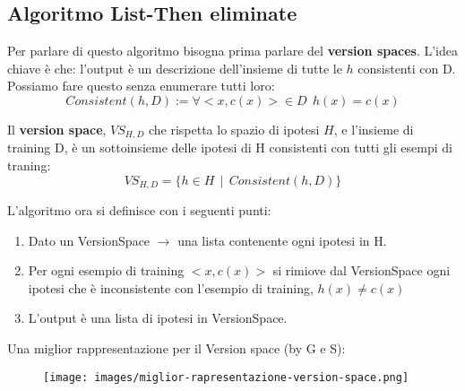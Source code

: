 \subsection{Algoritmo List-Then eliminate}
Per parlare di questo algoritmo bisogna prima parlare del \textbf{version spaces}. L'idea chiave è che: l'output
è un descrizione dell'insieme di tutte le $h$ consistenti con D. Possiamo fare questo senza enumerare tutti loro:
$$Consistent(h, D) := \forall <x, c(x)> \in D\:\: h(x) = c(x)$$
\begin{definition}
    Il \textbf{version space}, $VS_{H,D}$ che rispetta lo spazio di ipotesi $H$, e l'insieme di training D, 
    è un sottoinsieme delle ipotesi di H consistenti con tutti gli esempi di traning:
    $$VS_{H,D} = \{h \in H \:\:|\:\: Consistent(h, D)\}$$
\end{definition}
\hspace{-15pt}L'algoritmo ora si definisce con i seguenti punti:
\begin{enumerate}
    \item Dato un VersionSpace $\to$ una lista contenente ogni ipotesi in H.
    \item Per ogni esempio di training $<x, c(x)>$ si rimiove dal VersionSpace ogni ipotesi
    che è inconsistente con l'esempio di training, $h(x) \neq c(x)$
    \item L'output è una lista di ipotesi in VersionSpace.
\end{enumerate}
Una miglior rappresentazione per il Version space (by G e S):
\begin{figure}[h!]
    \centering
    \texttt{[image: images/miglior-rapresentazione-version-space.png]}
\end{figure}

